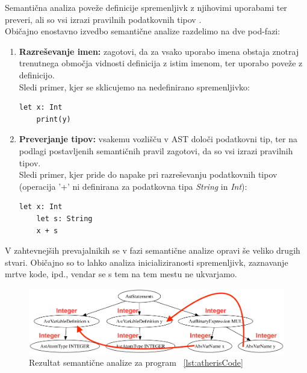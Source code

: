 \documentclass[a4paper, 12p]{book}
\begin{document}
Semantična analiza poveže definicije spremenljivk z njihovimi uporabami ter preveri, ali so vsi izrazi pravilnih podatkovnih tipov \cite{modernCompiler}. \\
\indent Običajno enostavno izvedbo semantične analize razdelimo na dve pod-fazi:
\begin{enumerate}
	\item \textbf{Razreševanje imen:} zagotovi, da za vsako uporabo imena obstaja znotraj trenutnega območja vidnosti definicija z istim imenom, ter uporabo poveže z definicijo. \\
	Sledi primer, kjer se sklicujemo na nedefinirano spremenljivko:
	
	\renewcommand{\lstlistingname}{Program}
	\begin{lstlisting}[caption={Primer programa, kjer spremenljivka \textit{y} ni definirana},label={lst:atherisCodeNameError},captionpos=b]
	let x: Int
	print(y)
	\end{lstlisting}
	
	\item \textbf{Preverjanje tipov:} vsakemu vozlišču v AST določi podatkovni tip, ter na podlagi postavljenih semantičnih pravil zagotovi, da so vsi izrazi pravilnih tipov. \\
	Sledi primer, kjer pride do napake pri razreševanju podatkovnih tipov (operacija '+' ni definirana za podatkovna tipa \textit{String} in \textit{Int}):
	
	\renewcommand{\lstlistingname}{Program}
	\begin{lstlisting}[caption={Primer programa, kjer je napaka v podatkovnih tipih},label={lst:atherisCodeTypeError},captionpos=b]
	let x: Int
	let s: String
	x + s
	\end{lstlisting}
	
\end{enumerate}

V zahtevnejših prevajalnikih se v fazi semantične analize opravi še veliko drugih stvari. Običajno so to lahko analiza inicializiranosti spremenljivk, zaznavanje mrtve kode, ipd., vendar se s tem na tem mestu ne ukvarjamo.

\begin{figure}[h]
	\begin{center}
		\includegraphics[width=1\textwidth]{resources/astSeman.png}
	\end{center}
	\caption{Rezultat semantične analize za program ~\ref{lst:atherisCode}}
	\label{image:astSeman}
\end{figure}
\end{document}
